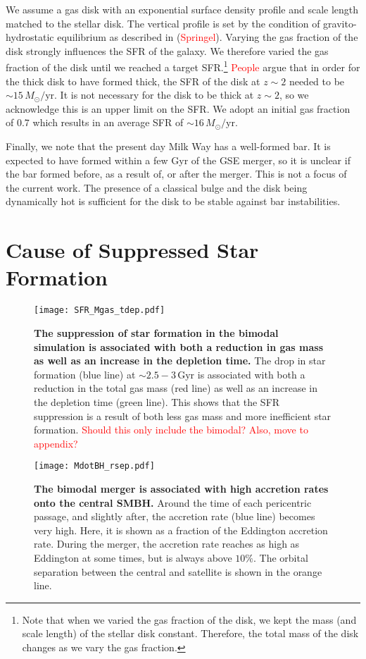 \documentclass[linenumbers, twocolumn]{aastex631}
\newcommand{\Msun}{\ensuremath{M_{\odot}}}
\newcommand{\Gyr}{\ensuremath{\textrm{Gyr}}}
\newcommand{\yr}{\ensuremath{\textrm{yr}}}
\newcommand{\red}[1]{\textcolor{red}{#1}}
\begin{document}
We assume a gas disk with an exponential surface density profile and scale
length matched to the stellar disk. The vertical profile is set by the condition
of gravito-hydrostatic equilibrium as described in (\textcolor{red}{Springel}).
Varying the gas fraction of the disk strongly influences the SFR of the galaxy.
We therefore varied the gas fraction of the disk until we reached a target
SFR.\footnote{Note that when we varied the gas fraction of the disk, we kept the
mass (and scale length) of the stellar disk constant. Therefore, the total mass
of the disk changes as we vary the gas fraction.} \textcolor{red}{People} argue
that in order for the thick disk to have formed thick, the SFR of the disk at
$z\sim2$ needed to be $\sim15\,\Msun/\yr$. It is not necessary for the disk to
be thick at $z\sim2$, so we acknowledge this is an upper limit on the SFR. We
adopt an initial gas fraction of $0.7$ which results in an average SFR of
$\sim16\,\Msun/\yr$.

Finally, we note that the present day Milk Way has a well-formed bar. It is
expected to have formed within a few Gyr of the GSE merger, so it is unclear if
the bar formed before, as a result of, or after the merger. This is not a focus
of the current work. The presence of a classical bulge and the disk being
dynamically hot is sufficient for the disk to be stable against bar
instabilities.

\section{Cause of Suppressed Star Formation}

\begin{figure*}
  \centering
  \texttt{[image: SFR\_Mgas\_tdep.pdf]}
  \caption{\textbf{The suppression of star formation in the bimodal simulation is associated with both a reduction in gas mass as well as an increase in the depletion time.} The drop in star formation (blue line) at $\sim2.5-3\,\Gyr$ is associated with both a reduction in the total gas mass (red line) as well as an increase in the depletion time (green line). This shows that the SFR suppression is a result of both less gas mass and more inefficient star formation. \red{Should this only include the bimodal? Also, move to appendix?}}
  \label{fig:SFR_Mgas_tdep}
\end{figure*}

\begin{figure}
  \centering
  \texttt{[image: MdotBH\_rsep.pdf]}
  \caption{\textbf{The bimodal merger is associated with high accretion rates onto the central SMBH.} Around the time of each pericentric passage, and slightly after, the accretion rate (blue line) becomes very high. Here, it is shown as a fraction of the Eddington accretion rate. During the merger, the accretion rate reaches as high as Eddington at some times, but is always above $10\%$. The orbital separation between the central and satellite is shown in the orange line.}
  \label{fig:MdotBH_rsep}
\end{figure}
\end{document}
